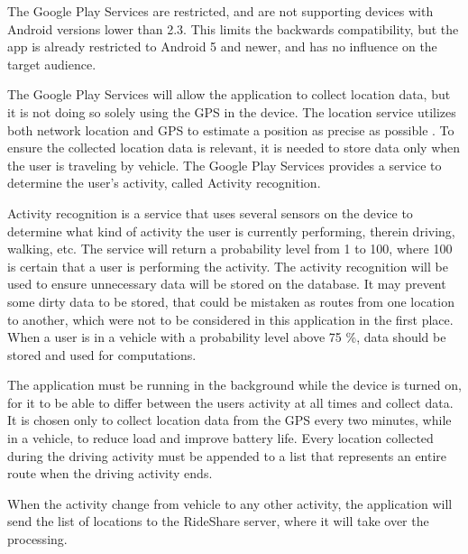 The Google Play Services are restricted, and are not supporting devices with Android versions lower than 2.3. 
This limits the backwards compatibility, but the app is already restricted to Android 5 and newer, and has no influence on the target audience.

The Google Play Services will allow the application to collect location data, but it is not doing so solely using the GPS in the device. 
The location service utilizes both network location and GPS to estimate a position as precise as possible \cite{GapiLocation}. 
To ensure the collected location data is relevant, it is needed to store data only when the user is traveling by vehicle.
The Google Play Services provides a service to determine the user's activity, called Activity recognition. 

Activity recognition is a service that uses several sensors on the device to determine what kind of activity the user is currently performing, therein driving, walking, etc.
The service will return a probability level from 1 to 100, where 100 is certain that a user is performing the activity.
The activity recognition will be used to ensure unnecessary data will be stored on the database. 
It may prevent some dirty data to be stored, that could be mistaken as routes from one location to another, which were not to be considered in this application in the first place. 
When a user is in a vehicle with a probability level above 75 \%, data should be stored and used for computations.

The application must be running in the background while the device is turned on, for it to be able to differ between the users activity at all times and collect data. 
It is chosen only to collect location data from the GPS every two minutes, while in a vehicle, to reduce load and improve battery life. 
Every location collected during the driving activity must be appended to a list that represents an entire route when the driving activity ends.

When the activity change from vehicle to any other activity, the application will send the list of locations to the RideShare server, where it will take over the processing. 